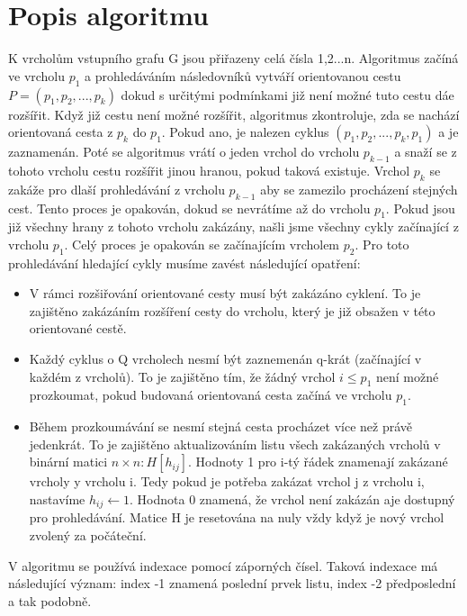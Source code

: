     \section{Popis algoritmu}
    K vrcholům vstupního grafu G jsou přiřazeny celá čísla 1,2...n. Algoritmus začíná ve vrcholu $p_1$ a prohledáváním následovníků vytváří orientovanou cestu $P=(p_1,p_2,...,p_k)$ dokud s určitými podmínkami již není možné tuto cestu dáe rozšířit. Když již cestu není možné rozšířit, algoritmus zkontroluje, zda se nachází orientovaná cesta z $p_k$ do $p_1$. Pokud ano, je nalezen cyklus $(p_1,p_2,...,p_k,p_1)$ a je zaznamenán. Poté se algoritmus vrátí o jeden vrchol do vrcholu $p_{k-1}$ a snaží se z tohoto vrcholu cestu rozšířit jinou hranou, pokud taková existuje. Vrchol $p_k$ se zakáže pro dlaší prohledávání z vrcholu $p_{k-1}$ aby se zamezilo procházení stejných cest. Tento proces je opakován, dokud se nevrátíme až do vrcholu $p_1$. Pokud jsou již všechny hrany z tohoto vrcholu zakázány, našli jsme všechny cykly začínající z vrcholu $p_1$. Celý proces je opakován se začínajícím vrcholem $p_2$. Pro toto prohledávání hledající cykly musíme zavést následující opatření:
    \begin{itemize}
        \item V rámci rozšiřování orientované cesty musí být zakázáno cyklení. To je zajištěno zakázáním rozšíření cesty do vrcholu, který je již obsažen v této orientované cestě.
        \item Každý cyklus o Q vrcholech nesmí být zaznemenán q-krát (začínající v každém z vrcholů). To je zajištěno tím, že žádný vrchol $i\leq p_1$ není možné prozkoumat, pokud budovaná orientovaná cesta začíná ve vrcholu $p_1$.
        \item Během prozkoumávání se nesmí stejná cesta procházet více než právě jedenkrát. To je zajištěno aktualizováním listu všech zakázaných vrcholů v binární matici $n \times n : H[h_{i j}]$. Hodnoty 1 pro i-tý řádek znamenají zakázané vrcholy y vrcholu i. Tedy pokud je potřeba zakázat vrchol j z vrcholu i, nastavíme $h_{ij} \leftarrow 1$. Hodnota 0 znamená, že vrchol není zakázán  aje dostupný pro prohledávání. Matice H je resetována na nuly vždy když je nový vrchol zvolený za počáteční.
    \end{itemize}
    V algoritmu se používá indexace pomocí záporných čísel. Taková indexace má následující význam: index -1 znamená poslední prvek listu, index -2 předposlední a tak podobně.

